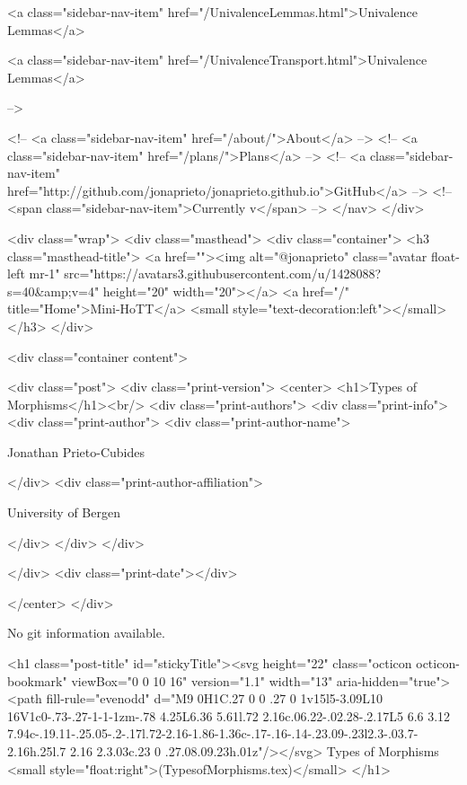           <a class="sidebar-nav-item" href="/UnivalenceLemmas.html">Univalence Lemmas</a>
        
      
    
      
        
          <a class="sidebar-nav-item" href="/UnivalenceTransport.html">Univalence Lemmas</a>
        
      
     -->

    <!-- <a class="sidebar-nav-item" href="/about/">About</a> -->
    <!-- <a class="sidebar-nav-item" href="/plans/">Plans</a> -->
    <!-- <a class="sidebar-nav-item" href="http://github.com/jonaprieto/jonaprieto.github.io">GitHub</a> -->
    <!-- <span class="sidebar-nav-item">Currently v</span> -->
  </nav>
</div>

    <div class="wrap">
      <div class="masthead">
        <div class="container">
          <h3 class="masthead-title">
            <a href=""><img alt="@jonaprieto" class="avatar float-left mr-1" src="https://avatars3.githubusercontent.com/u/1428088?s=40&amp;v=4" height="20" width="20"></a>
            <a href="/" title="Home">Mini-HoTT</a>
            <small style="text-decoration:left"></small>
          </h3>
        </div>
      
      <div class="container content">
        







<div class="post">
  <div class="print-version">
    <center>
      <h1>Types of Morphisms</h1><br/>
        <div class="print-authors">
          <div class="print-info">
            <div class="print-author">
              <div class="print-author-name">
                
                  Jonathan Prieto-Cubides
                
              </div>
              <div class="print-author-affiliation">
                
                  University of Bergen
                
                </div>
            </div>
          </div>
          
          
        </div>
        <div class="print-date"></div>
        
        
    </center>
  </div>

  
  No git information available.
  

  <h1 class="post-title" id="stickyTitle"><svg height="22" class="octicon octicon-bookmark" viewBox="0 0 10 16" version="1.1" width="13" aria-hidden="true"><path fill-rule="evenodd" d="M9 0H1C.27 0 0 .27 0 1v15l5-3.09L10 16V1c0-.73-.27-1-1-1zm-.78 4.25L6.36 5.61l.72 2.16c.06.22-.02.28-.2.17L5 6.6 3.12 7.94c-.19.11-.25.05-.2-.17l.72-2.16-1.86-1.36c-.17-.16-.14-.23.09-.23l2.3-.03.7-2.16h.25l.7 2.16 2.3.03c.23 0 .27.08.09.23h.01z"/></svg> Types of Morphisms <small style="float:right">(TypesofMorphisms.tex)</small>
  </h1>

